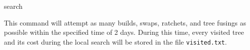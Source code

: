 \begin{command}{search}{}
\begin{poyexamples}
	 {This command will attempt as many builds, swaps, ratchets, and tree
           fusings as possible within the specified time of 2 days.  During this 
         time, every visited tree and its cost during the local search will be stored in the file
            \texttt{visited.txt}.}

            \end{poyexamples}

	\begin{poyalso}
	\end{poyalso}

\end{command}

   

